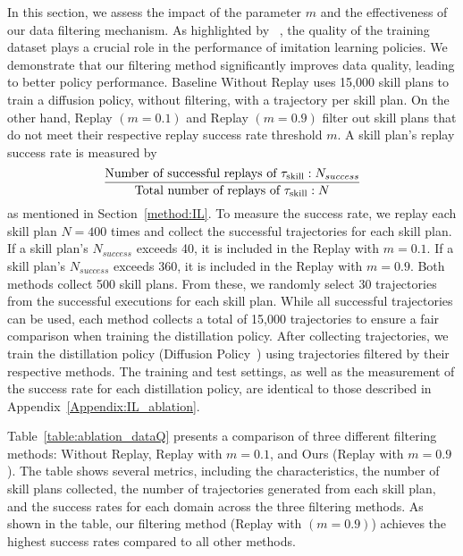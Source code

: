 
In this section, we assess the impact of the parameter \( m \) and the effectiveness of our data filtering mechanism. As highlighted by ~\citet{mandlekar2022matters}, the quality of the training dataset plays a crucial role in the performance of imitation learning policies. We demonstrate that our filtering method significantly improves data quality, leading to better policy performance. Baseline Without Replay uses 15,000 skill plans to train a diffusion policy, without filtering, with a trajectory per skill plan. On the other hand, Replay $(m=0.1)$ and Replay $(m=0.9)$ filter out skill plans that do not meet their respective replay success rate threshold $m$. A skill plan's replay success rate is measured by
\[
\frac{\text{Number of successful replays of }\tau_{\text{skill}}: N_{success}}{\text{Total number of replays of }\tau_{\text{skill}}: N}
\]
as mentioned in Section~\ref{method:IL}. To measure the success rate, we replay each skill plan \( N = 400 \) times and collect the successful trajectories for each skill plan. If a skill plan's \( N_{success} \) exceeds 40, it is included in the Replay with \( m = 0.1 \). If a skill plan's \( N_{success} \) exceeds 360, it is included in the Replay with \( m = 0.9 \). Both methods collect 500 skill plans. From these, we randomly select 30 trajectories from the successful executions for each skill plan. While all successful trajectories can be used, each method collects a total of 15,000 trajectories to ensure a fair comparison when training the distillation policy. After collecting trajectories, we train the distillation policy (Diffusion Policy~\cite{chi2023diffusion}) using trajectories filtered by their respective methods. The training and test settings, as well as the measurement of the success rate for each distillation policy, are identical to those described in Appendix~\ref{Appendix:IL_ablation}.

Table~\ref{table:ablation_dataQ} presents a comparison of three different filtering methods: Without Replay, Replay with \( m = 0.1 \), and Ours (Replay with \( m = 0.9 \)). The table shows several metrics, including the characteristics, the number of skill plans collected, the number of trajectories generated from each skill plan, and the success rates for each domain across the three filtering methods. As shown in the table, our filtering method (Replay with $(m=0.9)$) achieves the highest success rates compared to all other methods.


